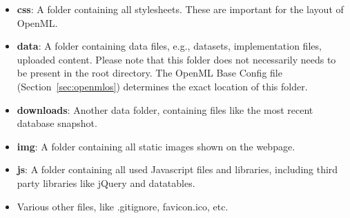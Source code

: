 \documentclass[10pt]{article}
\begin{document}
\begin{itemize}
\item \textbf{css}: A folder containing all stylesheets. These are important for the layout of OpenML.
\item \textbf{data}: A folder containing data files, e.g., datasets, implementation files, uploaded content. Please note that this folder does not necessarily needs to be present in the root directory. The OpenML Base Config file (Section~\ref{sec:openmlos}) determines the exact location of this folder. 
\item \textbf{downloads}: Another data folder, containing files like the most recent database snapshot. 
\item \textbf{img}: A folder containing all static images shown on the webpage.
\item \textbf{js}: A folder containing all used Javascript files and libraries, including third party libraries like jQuery and datatables. 
\item Various other files, like .gitignore, favicon.ico, etc. 
\end{itemize}
\end{document}
